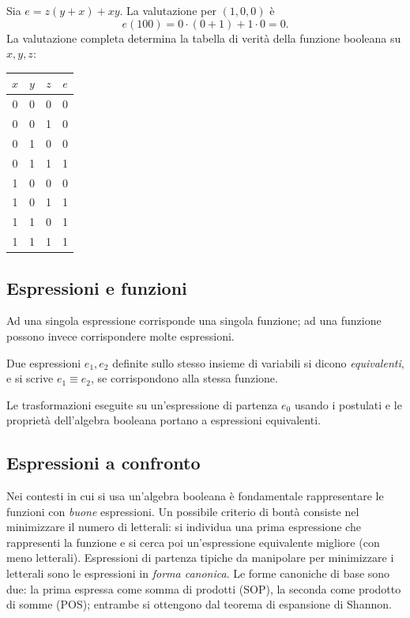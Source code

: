 \documentclass[11pt,a4paper]{article}
\begin{document}
\begin{esempio}
Sia $e = z(y + x) + xy$. La valutazione per $(1,0,0)$ è
\[
  e(100) = 0 \cdot (0 + 1) + 1 \cdot 0 = 0 .
\]
La valutazione completa determina la tabella di verità della funzione booleana
su $x, y, z$:
\begin{center}
\begin{tabular}{ccc|c}
$x$ & $y$ & $z$ & $e$ \\ \midrule
0 & 0 & 0 & 0 \\
0 & 0 & 1 & 0 \\
0 & 1 & 0 & 0 \\
0 & 1 & 1 & 1 \\
1 & 0 & 0 & 0 \\
1 & 0 & 1 & 1 \\
1 & 1 & 0 & 1 \\
1 & 1 & 1 & 1
\end{tabular}
\end{center}
\end{esempio}

\subsection{Espressioni e funzioni}

Ad una singola espressione corrisponde una singola funzione; ad una funzione
possono invece corrispondere molte espressioni.

\begin{definizione}
Due espressioni $e_1, e_2$ definite sullo stesso insieme di variabili si dicono
\emph{equivalenti}, e si scrive $e_1 \equiv e_2$, se corrispondono alla stessa
funzione.
\end{definizione}

Le trasformazioni eseguite su un'espressione di partenza $e_0$ usando i
postulati e le proprietà dell'algebra booleana portano a espressioni
equivalenti.

\subsection{Espressioni a confronto}

Nei contesti in cui si usa un'algebra booleana è fondamentale rappresentare le
funzioni con \emph{buone} espressioni. Un possibile criterio di bontà consiste
nel minimizzare il numero di letterali: si individua una prima espressione che
rappresenti la funzione e si cerca poi un'espressione equivalente migliore (con
meno letterali). Espressioni di partenza tipiche da manipolare per minimizzare i
letterali sono le espressioni in \emph{forma canonica}. Le forme canoniche di
base sono due: la prima espressa come somma di prodotti (SOP), la seconda come
prodotto di somme (POS); entrambe si ottengono dal teorema di espansione di
Shannon.
\end{document}
